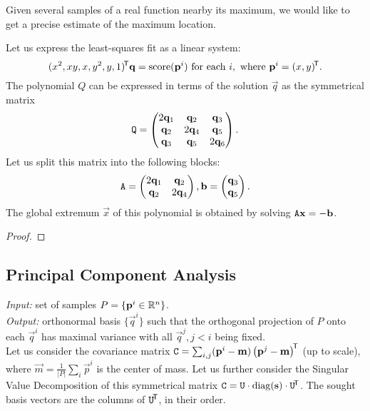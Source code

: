 Given several samples of a real function nearby its maximum, we would like to get a precise estimate of the maximum location.

Let us express the least-squares fit as a linear system:
$$(x^2, xy, x, y^2, y, 1)^{\!\mathsf{T}} \mathbf{q} = \textrm{score}(\mathbf{p}^i) \text{ for each } i, \text{ where } \mathbf{p}^i = (x, y)^{\!\mathsf{T}}.$$
The polynomial $Q$ can be expressed in terms of the solution $\vec q$ as the symmetrical matrix
$$\mathtt{Q} = \begin{pmatrix}
 2 \mathbf{q}_1 & \mathbf{q}_2 & \mathbf{q}_3 \\
 \mathbf{q}_2 & 2 \mathbf{q}_4 & \mathbf{q}_5 \\
 \mathbf{q}_3 & \mathbf{q}_5 & 2 \mathbf{q}_6
\end{pmatrix}.$$
Let us split this matrix into the following blocks:
$$\mathtt{A} = \begin{pmatrix}
 2 \mathbf{q}_1 & \mathbf{q}_2 \\
 \mathbf{q}_2 & 2 \mathbf{q}_4 \\
\end{pmatrix},
\mathbf{b} = \begin{pmatrix}
 \mathbf{q}_3 \\
 \mathbf{q}_5 \\
\end{pmatrix}.$$
The global extremum $\vec x$ of this polynomial is obtained by solving $\mathtt{A} \mathbf{x} = -\mathbf{b}$.

\begin{proof}
\todo{\dots}
\end{proof}

\subsection{Principal Component Analysis}
\textit{Input:} set of samples $P = \{\mathbf{p}^i \in \mathbb{R}^n \}$.\\
\textit{Output:} orthonormal basis $\{\vec q^i\}$ such that the orthogonal projection of $P$ onto each $\vec q^i$ has maximal variance with all $\vec q^j, j < i$ being fixed.\\

Let us consider the covariance matrix $\mathtt{C} = \sum_{i,j} (\mathbf{p}^i - \mathbf{m}) \left(\mathbf{p}^j - \mathbf{m} \right) ^{\!\mathsf{T}}$ (up to scale), where $\vec m = \frac 1 {|P|} \sum_i \vec p^i$ is the center of mass. Let us further consider the Singular Value Decomposition of this symmetrical matrix $\mathtt{C} = \mathtt{U} \cdot \mathrm{diag}(\mathbf{s}) \cdot \mathtt{U}^{\!\mathsf{T}}$.
The sought basis vectors are the columns of $\mathtt{U}^{\!\mathsf{T}}$, in their order.

